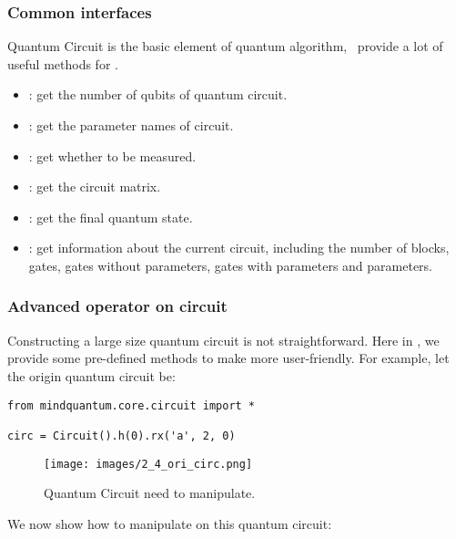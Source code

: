 \subsubsection{Common interfaces}

Quantum Circuit is the basic element of quantum algorithm, \MindQuantum\ provide a lot of useful methods for \Circuit.

\begin{itemize}
    \item \propnqubits: get the number of qubits of quantum circuit.
    \item \propparamsname: get the parameter names of circuit.
    \item \prophasmeasuregate: get whether to be measured.
    \item \methodmatrix: get the circuit matrix.
    \item \methodgetqs: get the final quantum state.
    \item \methodsummary: get information about the current circuit, including the number of blocks, gates, gates without parameters, gates with parameters and parameters.
\end{itemize}

\subsubsection{Advanced operator on circuit}

Constructing a large size quantum circuit is not straightforward. Here in \MindQuantum, we provide some pre-defined methods to make \Circuit more user-friendly. For example, let the origin quantum circuit be:

\begin{lstlisting}
from mindquantum.core.circuit import *

circ = Circuit().h(0).rx('a', 2, 0)
\end{lstlisting}

\begin{figure}[H]
    \begin{center}
        \texttt{[image: images/2\_4\_ori\_circ.png]}
    \end{center}
    \caption{Quantum Circuit need to manipulate.}
\end{figure}
We now show how to manipulate on this quantum circuit:


